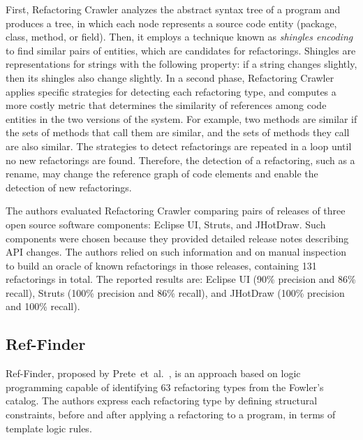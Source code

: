 First, Refactoring Crawler analyzes the abstract syntax tree of a program and produces a tree, in which each node represents a source code entity (package, class, method, or field).
Then, it employs a technique known as \emph{shingles encoding} to find 
similar pairs of entities, which are candidates for refactorings.
Shingles are representations for strings with the following property: if a string changes slightly, then its shingles also change slightly.
In a second phase, Refactoring Crawler applies specific strategies for detecting each refactoring type, and computes a more costly metric that determines the similarity of references among code entities in the two versions of the system. For example, two methods are similar if the sets of methods that call them are similar, and the sets of methods they call are also similar.
The strategies to detect refactorings are repeated in a loop until no new refactorings are found. Therefore, the detection of a refactoring, such as a rename, may change the reference graph of code elements and enable the detection of new refactorings.

The authors evaluated Refactoring Crawler comparing pairs of releases of three open source software components: Eclipse UI, Struts, and JHotDraw. Such components were chosen because they provided detailed release notes describing API changes. The authors relied on such information and on manual inspection to build an oracle of known refactorings in those releases, containing 131 refactorings in total.
The reported results are: Eclipse UI (90\% precision and 86\% recall), Struts (100\% precision and 86\% recall), and JHotDraw (100\% precision and 100\% recall).


\subsection{Ref-Finder}

Ref-Finder, proposed by Prete~et~al.~\cite{prete2010template,Kim:2010:RefFinder}, is an approach based on logic programming capable of identifying 63 refactoring types from the Fowler's catalog\cite{Fowler:1999}.
The authors express each refactoring type by defining structural constraints, before and after applying a refactoring to a program, in terms of template logic rules.

